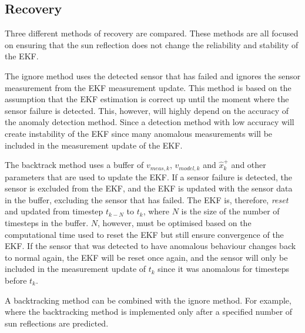 \documentclass[letterpaper, 10 pt, conference]{ieeeconf}  %
\begin{document}
\subsection{Recovery}
Three different methods of recovery are compared. These methods are all focused on ensuring that the sun reflection does not change the reliability and stability of the EKF.

The ignore method uses the detected sensor that has failed and ignores the sensor measurement from the EKF measurement update. This method is based on the assumption that the EKF estimation is correct up until the moment where the sensor failure is detected. This, however, will highly depend on the accuracy of the anomaly detection method. Since a detection method with low accuracy will create instability of the EKF since many anomalous measurements will be included in the measurement update of the EKF.


The backtrack method uses a buffer of $v_{meas,k}$, $v_{model,k}$ and $\hat{x}_k^+$ and other parameters that are used to update the EKF. If a sensor failure is detected, the sensor is excluded from the EKF, and the EKF is updated with the sensor data in the buffer, excluding the sensor that has failed. The EKF is, therefore, \emph{reset} and updated from timestep $t_{k-N}$ to $t_k$, where $N$ is the size of the number of timesteps in the buffer. $N$, however, must be optimised based on the computational time used to reset the EKF but still ensure convergence of the EKF. If the sensor that was detected to have anomalous behaviour changes back to normal again, the EKF will be reset once again, and the sensor will only be included in the measurement update of $t_k$ since it was anomalous for timesteps before $t_k$.

A backtracking method can be combined with the ignore method. For example, where the backtracking method is implemented only after a specified number of sun reflections are predicted.
\end{document}
